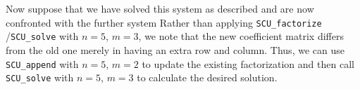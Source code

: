 \documentclass{galahad}
\newcommand{\packagename}{SCU}
\begin{document}
Now suppose that we have solved this system as described and are now 
confronted with the further system 
Rather than applying {\tt \packagename\_factorize} /{\tt \packagename\_solve} 
with $n = 5$, $m = 3$, we note 
that the new coefficient matrix differs from the old one merely 
in having 
an extra row and column. Thus, we can use 
{\tt \packagename\_append} with $n = 5$, $m = 2$ to update the existing factorization 
and then call 
{\tt \packagename\_solve} with $n = 5$, $m = 3$ to calculate the desired solution. 
\end{document}
